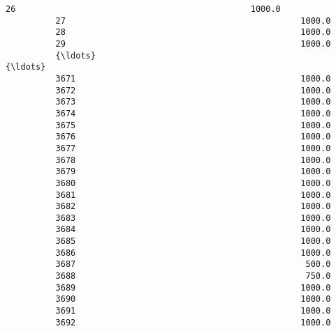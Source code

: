\documentclass[11pt]{article}
\begin{document}
\begin{Verbatim}[commandchars=\\\{\}]
          26                                               1000.0                               
          27                                               1000.0                               
          28                                               1000.0                               
          29                                               1000.0                               
          {\ldots}                                                 {\ldots}                               
          3671                                             1000.0                               
          3672                                             1000.0                               
          3673                                             1000.0                               
          3674                                             1000.0                               
          3675                                             1000.0                               
          3676                                             1000.0                               
          3677                                             1000.0                               
          3678                                             1000.0                               
          3679                                             1000.0                               
          3680                                             1000.0                               
          3681                                             1000.0                               
          3682                                             1000.0                               
          3683                                             1000.0                               
          3684                                             1000.0                               
          3685                                             1000.0                               
          3686                                             1000.0                               
          3687                                              500.0                               
          3688                                              750.0                               
          3689                                             1000.0                               
          3690                                             1000.0                               
          3691                                             1000.0                               
          3692                                             1000.0                               

\end{Verbatim}
\end{document}
